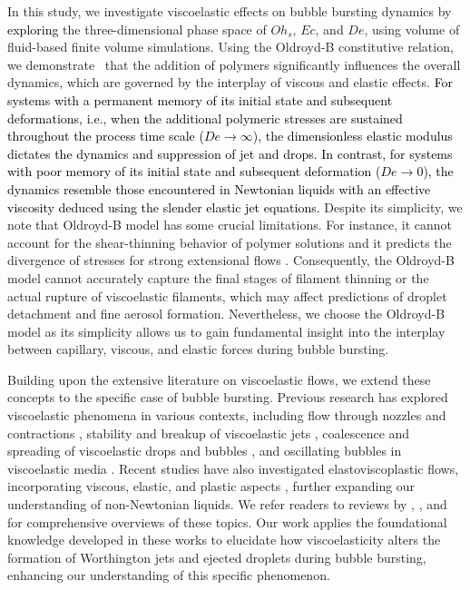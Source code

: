 \documentclass{jfm}
\newcommand{\DL}[1]{{\textcolor{black}{#1}}}
\newcommand{\VS}[1]{{\textcolor{black}{#1}}}
\newcommand{\oo}{\color{black} \normalfont}
\newcommand{\bb}{\color{black} \normalfont}
\begin{document}
In this study, we investigate viscoelastic effects on bubble bursting dynamics by \DL{exploring} the three-dimensional phase space of $Oh_s$, $Ec$, and $De$, using volume of fluid-based finite volume simulations.
\oo Using the Oldroyd-B constitutive relation, we demonstrate\bb\, that the addition of polymers significantly influences the overall dynamics, which are governed by the interplay of viscous and elastic effects.
\VS{For systems with a permanent memory of its initial state and subsequent deformations, i.e., when the additional polymeric stresses are sustained throughout the process time scale ($De \to \infty$), the dimensionless elastic modulus dictates the dynamics and suppression of jet and drops.
In contrast, for systems with poor memory of its initial state and subsequent deformation ($De \to 0$), the dynamics resemble those encountered in Newtonian liquids with an effective viscosity deduced using the slender elastic jet equations.}
\oo Despite its simplicity, we note that Oldroyd-B model has some crucial limitations.
For instance, it cannot account for the shear-thinning behavior of polymer solutions and it predicts the divergence of stresses for strong extensional flows \citep{yamani2023master,alves2021numerical}.  
Consequently, the Oldroyd-B model cannot accurately capture the final stages of filament thinning or the actual rupture of viscoelastic filaments, which may affect predictions of droplet detachment and fine aerosol formation.
Nevertheless, we choose the Oldroyd-B model as its simplicity allows us to gain fundamental insight into the interplay between capillary, viscous, and elastic forces during bubble bursting.  \bb\,

Building upon the extensive literature on viscoelastic flows, we extend these concepts to the specific case of bubble bursting.
Previous research has explored viscoelastic phenomena in various contexts, including flow through nozzles and contractions \citep{hinch1993flow, chen1991interfacial, boyko2024flow}, stability and breakup of viscoelastic jets \citep{middleman1965stability, goren1982surface, bousfield1986nonlinear, chang1999iterated, anna2001elasto,pandey2021elastic,sen2024elastocapillary, zinelis2023transition}, coalescence and spreading of viscoelastic drops and bubbles \citep{bouillant2022rapid, dekker2022elasticity, oratis2023coalescence}, and oscillating bubbles in viscoelastic media \citep{oratis2024unifying}.
Recent studies have also investigated elastoviscoplastic flows, incorporating viscous, elastic, and plastic aspects \citep{putz2009solid, varchanis2019modeling, francca2024elasto, ari2024bursting}, further expanding our understanding of non-Newtonian liquids.
We refer readers to reviews by \citet{bogy1979drop}, \citet{eggers1997nonlinear}, and \citet{yarin1993free} for comprehensive overviews of these topics.
Our work applies the foundational knowledge developed in these works to elucidate how viscoelasticity alters the formation of Worthington jets and ejected droplets during bubble bursting, enhancing our understanding of this specific phenomenon.
\end{document}
